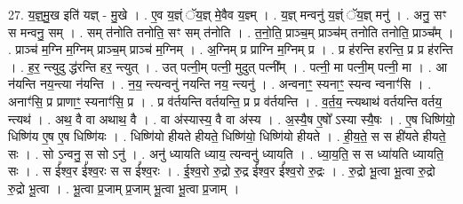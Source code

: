\documentclass[17pt]{extarticle}
\begin{document}
27. य॒ज्ञ्॒मु॒ख इति॑ यज्ञ् - मु॒खे । . ए॒व य॒ज्ञ्ं ॅय॒ज्ञ् मे॒वैव य॒ज्ञ्म् । . य॒ज्ञ् मन्वनु॑ य॒ज्ञ्ं ॅय॒ज्ञ् मनु॑ । . अनु॒ सꣳ स मन्वनु॒ सम् । . सम् त॑नोति तनोति॒ सꣳ सम् त॑नोति । . त॒नो॒ति॒ प्राञ्च॒म् प्राञ्च॑म् तनोति तनोति॒ प्राञ्च᳚म् । . प्राञ्च॑ म॒ग्नि म॒ग्निम् प्राञ्च॒म् प्राञ्च॑ म॒ग्निम् । . अ॒ग्निम् प्र प्राग्नि म॒ग्निम् प्र । . प्र ह॑रन्ति हरन्ति॒ प्र प्र ह॑रन्ति । . ह॒र॒ न्त्युदु द्ध॑रन्ति हर॒ न्त्युत् । . उत् पत्नी॒म् पत्नी॒ मुदुत् पत्नी᳚म् । . पत्नी॒ मा पत्नी॒म् पत्नी॒ मा । . आ न॑यन्ति नय॒न्त्या न॑यन्ति । . न॒य॒ न्त्यन्वनु॑ नयन्ति नय॒ न्त्यनु॑ । . अन्वनाꣳ॒॒ स्यनाꣳ॒॒ स्यन्व न्वनाꣳ॑सि । . अनाꣳ॑सि॒ प्र प्राणाꣳ॒॒ स्यनाꣳ॑सि॒ प्र । . प्र व॑र्तयन्ति वर्तयन्ति॒ प्र प्र व॑र्तयन्ति । . व॒र्त॒य॒ न्त्यथाथ॑ वर्तयन्ति वर्तय॒ न्त्यथ॑ । . अथ॒ वै वा अथाथ॒ वै । . वा अ॑स्यास्य॒ वै वा अ॑स्य । . अ॒स्यै॒ष ए॒षो᳚ ऽस्या स्यै॒षः । . ए॒ष धिष्णि॑यो॒ धिष्णि॑य ए॒ष ए॒ष धिष्णि॑यः । . धिष्णि॑यो हीयते हीयते॒ धिष्णि॑यो॒ धिष्णि॑यो हीयते । . ही॒य॒ते॒ स स ही॑यते हीयते॒ सः । . सो ऽन्वनु॒ स सो ऽनु॑ । . अनु॑ ध्यायति ध्याय॒ त्यन्वनु॑ ध्यायति । . ध्या॒य॒ति॒ स स ध्या॑यति ध्यायति॒ सः । . स ई᳚श्व॒र ई᳚श्व॒रः स स ई᳚श्व॒रः । . ई॒श्व॒रो रु॒द्रो रु॒द्र ई᳚श्व॒र ई᳚श्व॒रो रु॒द्रः । . रु॒द्रो भू॒त्वा भू॒त्वा रु॒द्रो रु॒द्रो भू॒त्वा । . भू॒त्वा प्र॒जाम् प्र॒जाम् भू॒त्वा भू॒त्वा प्र॒जाम् । \newline
\end{document}
